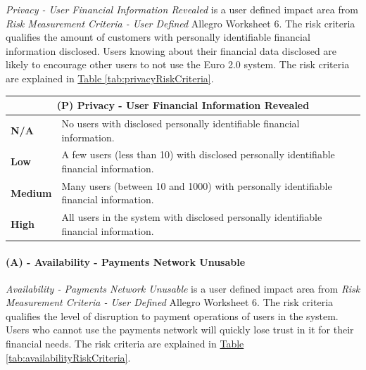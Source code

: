 \documentclass[12pt]{article} %
\newcommand{\hypertableref}[1]{\hyperref[#1]{Table \ref{#1}}}
\begin{document}
{\textit{Privacy - User Financial Information Revealed} is a user defined impact area from \textit{Risk Measurement Criteria - User Defined} Allegro Worksheet 6. The risk criteria qualifies the amount of customers with personally identifiable financial information disclosed. Users knowing about their financial data disclosed are likely to encourage other users to not use the Euro 2.0 system. The risk criteria are explained in \hypertableref{tab:privacyRiskCriteria}.

\begin{center}
\begin{tabular}{ | l | p{12cm} | }
  \hline
  \multicolumn{2}{|c|}{\textbf{(P) Privacy - User Financial Information Revealed}}
  \\ \hline
  \textbf{N/A} & No users with disclosed personally identifiable financial information.
  \\ \hline
  \textbf{Low} & A few users (less than 10) with disclosed personally identifiable financial information.
  \\ \hline
  \textbf{Medium} & Many users (between 10 and 1000) with personally identifiable financial information.
  \\ \hline
  \textbf{High} & All users in the system with disclosed personally identifiable financial information.
  \\ \hline
\end{tabular}
\end{center}
\label{tab:privacyRiskCriteria}

\paragraph{(A) - Availability - Payments Network Unusable}

\textit{Availability - Payments Network Unusable} is a user defined impact area from \textit{Risk Measurement Criteria - User Defined} Allegro Worksheet 6. The risk criteria qualifies the level of disruption to payment operations of users in the system. Users who cannot use the payments network will quickly lose trust in it for their financial needs. The risk criteria are explained in \hypertableref{tab:availabilityRiskCriteria}.

}
\end{document}
